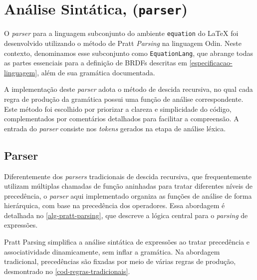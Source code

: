 
\section{Análise Sintática, (\texttt{parser})} \label{section-parser}

O \textit{parser} para a linguagem subconjunto do ambiente \verb|equation| do \LaTeX{} foi desenvolvido utilizando o método de Pratt \textit{Parsing} na linguagem Odin. Neste contexto, denominamos esse subconjunto como \texttt{EquationLang}, que abrange todas as partes essenciais para a definição de BRDFs descritas em \autoref{especificacao-linguagem}, além de sua gramática documentada.

A implementação deste \textit{parser} adota o método de descida recursiva, no qual cada regra de produção da gramática possui uma função de análise correspondente. Este método foi escolhido por priorizar a clareza e simplicidade do código, complementados por comentários detalhados para facilitar a compreensão. A entrada do \textit{parser} consiste nos \textit{tokens} gerados na etapa de análise léxica.


\subsection{Parser}

Diferentemente dos \textit{parsers} tradicionais de descida recursiva, que frequentemente utilizam múltiplas chamadas de função aninhadas para tratar diferentes níveis de precedência, o \textit{parser} aqui implementado organiza as funções de análise de forma hierárquica, com base na precedência dos operadores. Essa abordagem é detalhada no \autoref{alg-pratt-parsing}, que descreve a lógica central para o \textit{parsing} de expressões.

Pratt Parsing simplifica a análise sintática de expressões ao tratar precedência e associatividade dinamicamente, sem inflar a gramática. Na abordagem tradicional, precedências são fixadas por meio de várias regras de produção, desmontrado no \autoref{cod-regras-tradicionais}.

